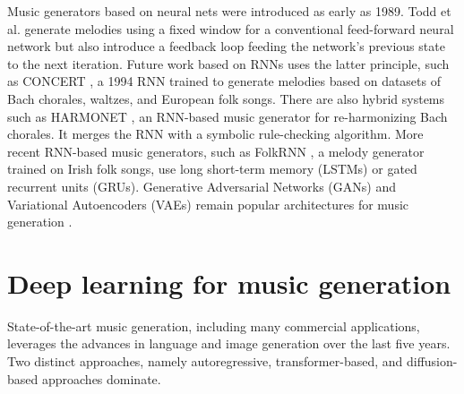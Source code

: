 Music generators based on neural nets were introduced as early as 1989. Todd et al. \cite{Todd_1989} generate melodies using a fixed window for a conventional feed-forward neural network but also introduce a feedback loop feeding the network's previous state to the next iteration. Future work based on RNNs uses the latter principle, such as CONCERT \cite{Mozer_1994}, a 1994 RNN trained to generate melodies based on datasets of Bach chorales, waltzes, and European folk songs. There are also hybrid systems such as HARMONET \cite{Hild_Feulner_Menzel_1991}, an RNN-based music generator for re-harmonizing Bach chorales. It merges the RNN with a symbolic rule-checking algorithm. More recent RNN-based music generators, such as FolkRNN \cite{Sturm_Ben-Tal_2016}, a melody generator trained on Irish folk songs, use long short-term memory (LSTMs) or gated recurrent units (GRUs). Generative Adversarial Networks (GANs) and Variational Autoencoders (VAEs) remain popular architectures for music generation \cite{Civit_Civit-Masot_Cuadrado_Escalona_2022}. 

\section{Deep learning for music generation}\label{section:deep_learning_generation}
State-of-the-art music generation, including many commercial applications, leverages the advances in language and image generation over the last five years. Two distinct approaches, namely autoregressive, transformer-based, and diffusion-based approaches dominate.


